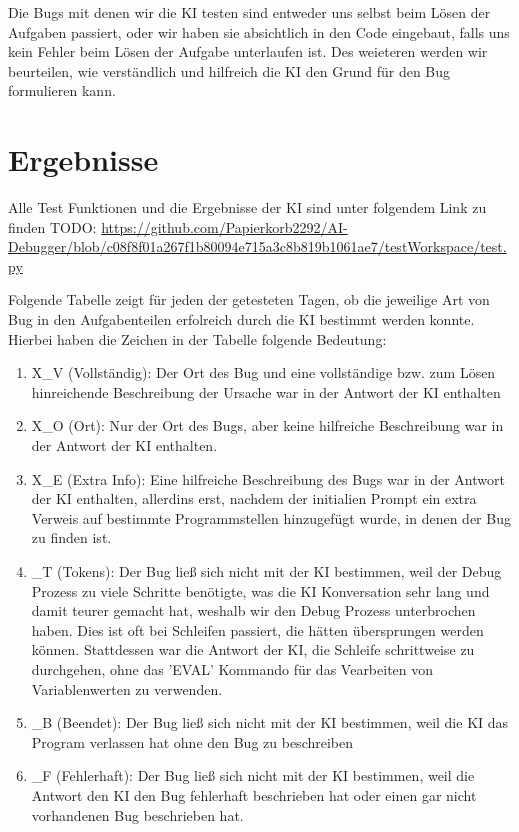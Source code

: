 \documentclass[a4paper,12pt,ngerman]{scrartcl}
\begin{document}
Die Bugs mit denen wir die KI testen sind entweder uns selbst beim Lösen der Aufgaben passiert, oder wir haben sie absichtlich in den Code eingebaut, falls uns kein Fehler beim Lösen der Aufgabe unterlaufen ist. Des weieteren werden wir beurteilen, wie verständlich und hilfreich die KI den Grund für den Bug formulieren kann.

\section{Ergebnisse}

Alle Test Funktionen und die Ergebnisse der KI sind unter folgendem Link zu finden TODO: \url{https://github.com/Papierkorb2292/AI-Debugger/blob/c08f8f01a267f1b80094e715a3c8b819b1061ae7/testWorkspace/test.py}

Folgende Tabelle zeigt für jeden der getesteten Tagen, ob die jeweilige Art von Bug in den Aufgabenteilen erfolreich durch die KI bestimmt werden konnte. Hierbei haben die Zeichen in der Tabelle folgende Bedeutung:
\begin{enumerate}
\item X_V (Vollständig): Der Ort des Bug und eine vollständige bzw. zum Lösen hinreichende Beschreibung der Ursache war in der Antwort der KI enthalten
\item X_O (Ort): Nur der Ort des Bugs, aber keine hilfreiche Beschreibung war in der Antwort der KI enthalten.
\item X_E (Extra Info): Eine hilfreiche Beschreibung des Bugs war in der Antwort der KI enthalten, allerdins erst, nachdem der initialien Prompt ein extra Verweis auf bestimmte Programmstellen hinzugefügt wurde, in denen der Bug zu finden ist.
\item _T (Tokens): Der Bug ließ sich nicht mit der KI bestimmen, weil der Debug Prozess zu viele Schritte benötigte, was die KI Konversation sehr lang und damit teurer gemacht hat, weshalb wir den Debug Prozess unterbrochen haben. Dies ist oft bei Schleifen passiert, die hätten übersprungen werden können. Stattdessen war die Antwort der KI, die Schleife schrittweise zu durchgehen, ohne das 'EVAL' Kommando für das Vearbeiten von Variablenwerten zu verwenden.
\item _B (Beendet):   Der Bug ließ sich nicht mit der KI bestimmen, weil die KI das Program verlassen hat ohne den Bug zu beschreiben
\item _F (Fehlerhaft): Der Bug ließ sich nicht mit der KI bestimmen, weil die Antwort den KI den Bug fehlerhaft beschrieben hat oder einen gar nicht vorhandenen Bug beschrieben hat.
\end{enumerate}
\end{document}
